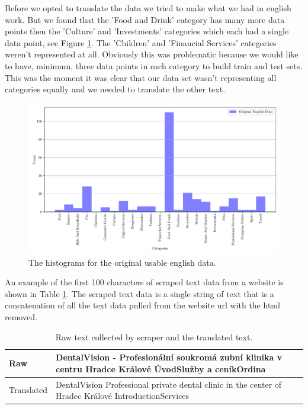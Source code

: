 Before we opted to translate the data we tried to make what we had in english work. But we found that the 'Food and Drink' category has many more data points then the 'Culture' and 'Investments' categories which each had a single data point, see Figure \ref{fig:original_english_counts}. The 'Children' and 'Financial Services' categories weren't represented at all. Obviously this was problematic because we would like to have, minimum, three data points in each category to build train and test sets. This was the moment it was clear that our data set wasn't representing all categories equally and we needed to translate the other text.

\begin{figure}[!ht]
  \centering
  \includegraphics[width=\textwidth]{../img/plot_original_english_counts.pdf}
  \caption{The histograms for the original usable english data.}
  \label{fig:original_english_counts}
\end{figure}

An example of the first 100 characters of scraped text data from a website is shown in Table \ref{tab:text_examples}. The scraped text data is a single string of text that is a concatenation of all the text data pulled from the website url with the html removed. 

\begin{table}[!ht]
\centering
\caption{Raw text collected by scraper and the translated text.}
\begin{tabular}{|l|p{10cm}|}
\hline
Raw & DentalVision - Profesionální soukromá zubní klinika v centru Hradce Králové ÚvodSlužby a ceníkOrdina \\ \hline
Translated & DentalVision Professional private dental clinic in the center of Hradec Králové IntroductionServices \\ \hline
\end{tabular}
\label{tab:text_examples}
\end{table}

